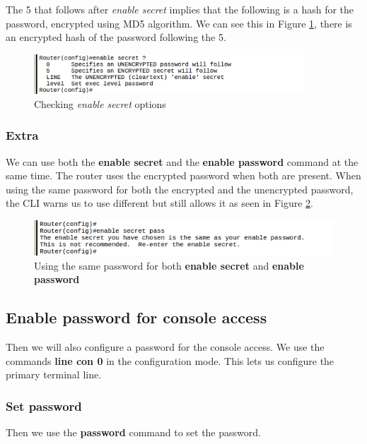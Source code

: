 \documentclass{article}
\begin{document}
The 5 that follows after \textit{enable secret} implies that the following is a hash for the password, encrypted using MD5 algorithm. We can see this in Figure \ref{fig:ensec5}, there is an encrypted hash of the password following the 5. 

\begin{figure}[h]
    \centering
    \includegraphics[width=0.9\textwidth]{imgs/ensec5}
    \caption{Checking \textit{enable secret} options}
    \label{fig:ensec5}
\end{figure}

\subsubsection{Extra}

We can use both the \textbf{enable secret} and the \textbf{enable password} command at the same time. The router uses the encrypted password when both are present. When using the same password for both the encrypted and the unencrypted password, the CLI warns us to use different but still allows it as seen in Figure \ref{fig:enpassonly}.

\begin{figure}[h]
    \centering
    \includegraphics[width=\textwidth]{imgs/enpassonly}
    \caption{Using the same password for both \textbf{enable secret} and \textbf{enable password}}
    \label{fig:enpassonly}
\end{figure}

\subsection{Enable password for console access}

Then we will also configure a password for the console access. We use the commands \textbf{line  con 0} in the configuration mode. This lets us configure the primary terminal line. 
\subsubsection{Set password}
Then we use the \textbf{password} command to set the password.
\end{document}

